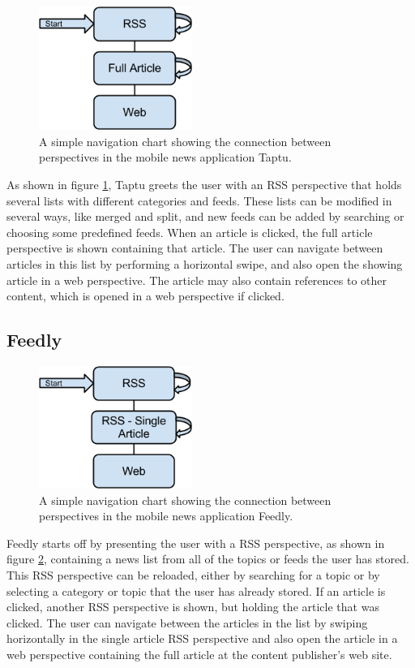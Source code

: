 \begin{figure}[!htbp]
\centering
\includegraphics[width=50mm]{GFX/statecharts/Taptu.png}
\caption{A simple navigation chart showing the connection between perspectives in the mobile news application Taptu.}
\label{state_chart_taptu}
\end{figure}

As shown in figure \ref{state_chart_taptu}, Taptu greets the user with an RSS perspective that holds several lists with different categories and feeds. These lists can be modified in several ways, like merged and split, and new feeds can be added by searching or choosing some predefined feeds. When an article is clicked, the full article perspective is shown containing that article. The user can navigate between articles in this list by performing a horizontal swipe, and also open the showing article in a web perspective. The article may also contain references to other content, which is opened in a web perspective if clicked.

\subsection{Feedly}

\begin{figure}[!htbp]
\centering
\includegraphics[width=50mm]{GFX/statecharts/Feedly.png}
\caption{A simple navigation chart showing the connection between perspectives in the mobile news application Feedly.}
\label{state_chart_feedly}
\end{figure}

Feedly starts off by presenting the user with a RSS perspective, as shown in figure \ref{state_chart_feedly}, containing a news list from all of the topics or feeds the user has stored. This RSS perspective can be reloaded, either by searching for a topic or by selecting a category or topic that the user has already stored. If an article is clicked, another RSS perspective is shown, but holding the article that was clicked. The user can navigate between the articles in the list by swiping horizontally in the single article RSS perspective and also open the article in a web perspective containing the full article at the content publisher's web site.


